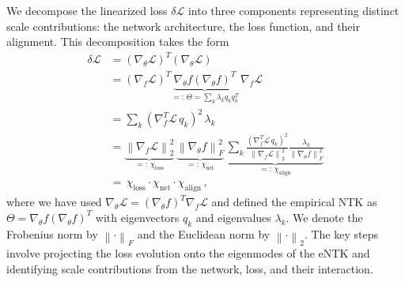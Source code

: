 

We decompose the linearized loss $\delta \mathcal{L}$ into three components representing distinct scale contributions: the network architecture, the loss function, and their alignment. 
This decomposition takes the form
\begin{align}
    \delta \mathcal{L}
    &= (\nabla_\theta \mathcal{L})^T  (\nabla_\theta \mathcal{L}) \\
    &= (\nabla_f \mathcal{L})^T \underbrace{\nabla_\theta f (\nabla_\theta f)^T}_{=: \, \Theta = \sum_{k} \lambda_k q_k q_k^T
    } \, \nabla_f \mathcal{L} \\
    &= \sum_{k} (\nabla_f^T \mathcal{L} \, q_k)^2 \, \lambda_k \label{eq:loss_evolution_spectral} \\
    &=\underbrace{\left\| \nabla_f \mathcal{L} \right\|_2^2 }_{=: \, \chi_{\text{loss}}} \,
    \underbrace{\left\| \nabla_\theta f \right\|_F^2}_{=: \, \chi_{\text{net}}} \,
    \underbrace{\sum_{k} \frac{ (\nabla_f^T \mathcal{L} \, q_k)^2 }{\left\| \nabla_f \mathcal{L} \right\|_2^2} \frac{\lambda_k}{\left\| \nabla_\theta f \right\|_F^2}}_{=: \, \chi_{\text{align}}} \\
    &= \, \chi_{\text{loss}} \cdot \chi_{\text{net}} \cdot \chi_{\text{align}} \, ,
    \label{eq:loss_evolution_factorized}
\end{align}
where we have used \(\nabla_\theta \mathcal{L} = (\nabla_\theta f)^T \nabla_f \mathcal{L}\) and defined the empirical NTK as \(\Theta = \nabla_\theta f (\nabla_\theta f)^T\) with eigenvectors \(q_k\) and eigenvalues \(\lambda_k\). We denote the Frobenius norm by \(\left\| \cdot \right\|_F\) and the Euclidean norm by \(\left\| \cdot \right\|_2\). 
The key steps involve projecting the loss evolution onto the eigenmodes of the eNTK and identifying scale contributions from the network, loss, and their interaction. 

